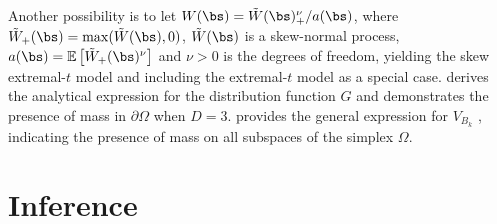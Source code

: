 \documentclass[12pt]{article}
\begin{document}
Another possibility is to let  $W(\bs)= \tilde{W}(\bs)_+^\nu / a(\bs)$, where $\tilde{W}_+(\bs) = \max(\tilde W(\bs),0)$, $\tilde W(\bs)$ is a skew-normal process, $a(\bs) = \mathbb{E} \left[ \tilde{W}_+(\bs)^\nu \right]$ and $\nu>0$ is the degrees of freedom, yielding the skew extremal-$t$ model \citep{Beranger.etal:2017} and including the extremal-$t$ model \citep{Opitz:2013} as a special case. \citet{Beranger.etal:2017} derives the analytical expression for the distribution function $G$ and demonstrates the presence of mass in $\partial\Omega$ when $D=3$.
\cite{Beranger.etal:2021} provides the general expression for $V_{B_k}$ \citep[see][for results specific to the extremal-$t$]{Thibaud.Opitz:2015}, indicating the presence of mass on all subspaces of the simplex $\Omega$.

\section{Inference}
\label{sec:inference}

\end{document}
